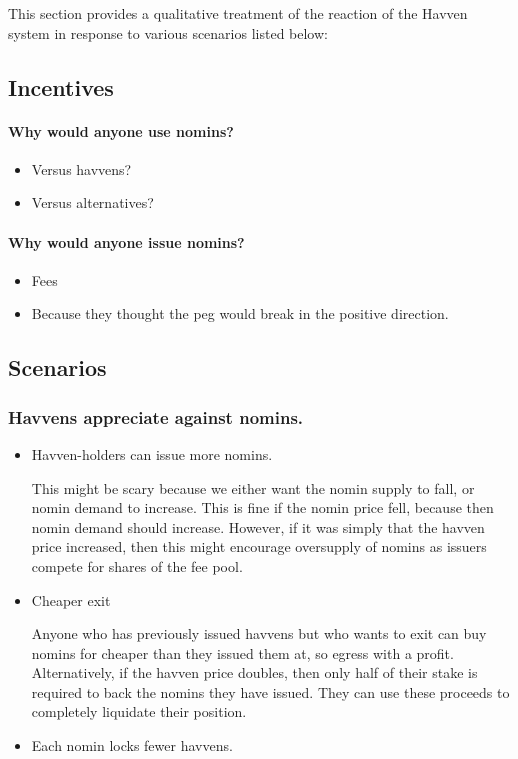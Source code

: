 This section provides a qualitative treatment of the reaction of the Havven system in response to various scenarios listed below:


\subsection{Incentives}

\paragraph{Why would anyone use nomins?}
\begin{itemize}
	\item Versus havvens?
	\item Versus alternatives?
\end{itemize}

\paragraph{Why would anyone issue nomins?}
\begin{itemize}
	\item Fees
	\item Because they thought the peg would break in the positive direction.
\end{itemize}

\subsection{Scenarios}

\subsubsection{Havvens appreciate against nomins.} \label{sec:havven-nomin-appreciation}
\begin{itemize}
	\item{Havven-holders can issue more nomins.}

	This might be scary because we either want the nomin supply to fall, or nomin demand to increase.
	This is fine if the nomin price fell, because then nomin demand should increase.
	However, if it was simply that the havven price increased, then this might encourage
	oversupply of nomins as issuers compete for shares of the fee pool.

	\item{Cheaper exit}

	Anyone who has previously issued havvens but who wants to exit can buy nomins for
	cheaper than they issued them at, so egress with a profit.
	Alternatively, if the havven price doubles, then only half of their stake is required
	to back the nomins they have issued. They can use these proceeds to completely liquidate
	their position.

	\item{Each nomin locks fewer havvens.}
	
\end{itemize}

